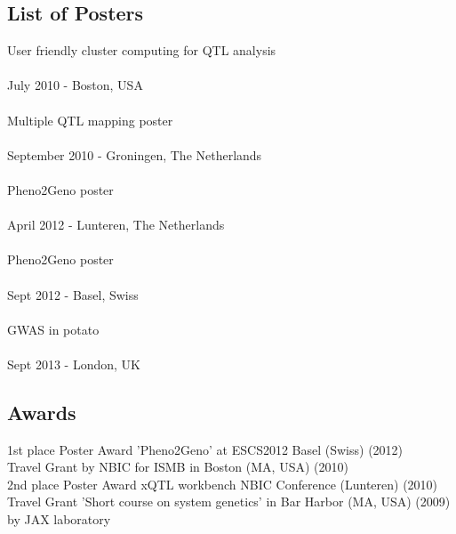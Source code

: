 \subsection*{List of Posters}
User friendly cluster computing for QTL analysis\\
  \\
   July 2010 - Boston, USA\\\\
Multiple QTL mapping poster\\
  \\
   September 2010 - Groningen, The Netherlands\\\\
Pheno2Geno poster\\
  \\
   April 2012 - Lunteren, The Netherlands\\\\
Pheno2Geno poster\\
  \\
   Sept 2012 - Basel, Swiss\\\\
GWAS in potato\\
  \\
   Sept 2013 - London, UK

\subsection*{Awards}
1st place Poster Award 'Pheno2Geno' at ESCS2012 Basel (Swiss) (2012)\\
Travel Grant by NBIC for ISMB in Boston (MA, USA) (2010)\\
2nd place Poster Award xQTL workbench NBIC Conference (Lunteren) (2010)\\
Travel Grant 'Short course on system genetics' in Bar Harbor (MA, USA) (2009) by JAX laboratory\\
